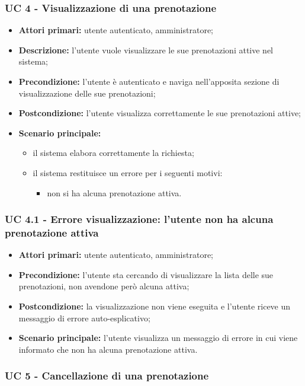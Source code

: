 \subsubsection{UC 4 - Visualizzazione di una prenotazione}

\begin{itemize}
\item \textbf{Attori primari:} utente autenticato, amministratore;
\item \textbf{Descrizione:} l’utente vuole visualizzare le sue prenotazioni attive nel sistema;
\item \textbf{Precondizione:} l’utente è autenticato e naviga nell’apposita sezione di visualizzazione delle sue prenotazioni;
\item \textbf{Postcondizione:} l’utente visualizza correttamente le sue prenotazioni attive;
\item \textbf{Scenario principale:} 
	\begin{itemize}
		\item il sistema elabora correttamente la richiesta;
		\item il sistema restituisce un errore per i seguenti motivi:
		\begin{itemize}
			\item non si ha alcuna prenotazione attiva.
		\end{itemize}
	\end{itemize}
\end{itemize}

\subsubsection{UC 4.1 - Errore visualizzazione: l'utente non ha alcuna prenotazione attiva}
\begin{itemize}
\item \textbf{Attori primari:} utente autenticato, amministratore;
\item \textbf{Precondizione:} l'utente sta cercando di visualizzare la lista delle sue prenotazioni, non avendone però alcuna attiva;
\item \textbf{Postcondizione:} la visualizzazione non viene eseguita e l'utente riceve un messaggio di errore auto-esplicativo;
\item \textbf{Scenario principale:} l'utente visualizza un messaggio di errore in cui viene informato che non ha alcuna prenotazione attiva.
\end{itemize}

\subsubsection{UC 5 - Cancellazione di una prenotazione}

